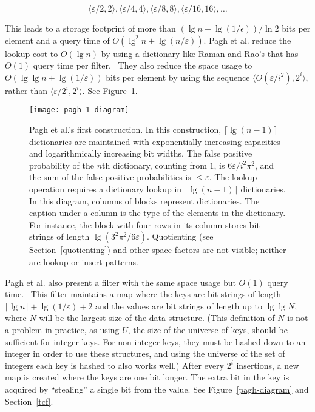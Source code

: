\documentclass[sigconf]{acmart}
\newcommand{\etal}{et al.}
\begin{document}
\[
\langle \varepsilon / 2, 2 \rangle,
 \langle \varepsilon / 4, 4 \rangle,
 \langle \varepsilon / 8, 8 \rangle,
 \langle \varepsilon / 16, 16 \rangle,
 \ldots
\]

This leads to a storage footprint of more than $(\lg n + \lg (1/\epsilon)) / \ln 2$ bits per element and a query time of $O(\lg^2 n + \lg (n/\varepsilon))$.
Pagh \etal{} reduce the lookup cost to $O(\lg n)$ by using a dictionary like Raman and Rao's that has $O(1)$ query time per filter.~\cite{psw,succinct}
They also reduce the space usage to $O(\lg \lg n + \lg (1/\varepsilon))$ bits per element by using the sequence $\langle O(\varepsilon / i^2),  2^i \rangle$, rather than  $\langle \varepsilon / 2^i,  2^i \rangle$.
See Figure~\ref{pagh-1-diagram}.

\begin{figure}
\texttt{[image: pagh-1-diagram]}
\caption{\label{pagh-1-diagram}
Pagh \etal{}'s first construction.
In this construction, $\lceil\lg (n-1) \rceil$ dictionaries are maintained with exponentially increasing capacities and logarithmically increasing bit widths.
The false positive probability of the $n$th dictionary, counting from $1$, is $6 \varepsilon / i^2 \pi^2$, and the sum of the false positive probabilities is $\le \varepsilon$.
The lookup operation requires a dictionary lookup in $\lceil\lg(n-1)\rceil$ dictionaries.\\
In this diagram, columns of blocks represent dictionaries.
The caption under a column is the type of the elements in the dictionary. For instance, the block with four rows in its column stores bit strings of length $\lg (3^2 \pi^2 / 6 \varepsilon)$.
Quotienting (see Section~\ref{quotienting}) and other space factors are not visible; neither are lookup or insert patterns.
}
\end{figure}

Pagh \etal{} also present a filter with the same space usage but $O(1)$ query time.~\cite{psw}
This filter maintains a map where the keys are bit strings of length $\lceil \lg n \rceil + \lg (1/\varepsilon) + 2$ and the values are bit strings of length up to $\lg \lg N$, where $N$ will be the largest size of the data structure.
(This definition of $N$ is not a problem in practice, as using $U$, the size of the universe of keys, should be sufficient for integer keys. For non-integer keys, they must be hashed down to an integer in order to use these structures, and using the universe of the set of integers each key is hashed to also works well.)
After every $2^i$ insertions, a new map is created where the keys are one bit longer.
The extra bit in the key is acquired by ``stealing'' a single bit from the value.
See Figure~\ref{pagh-diagram} and Section~\ref{tcf}.
\end{document}
